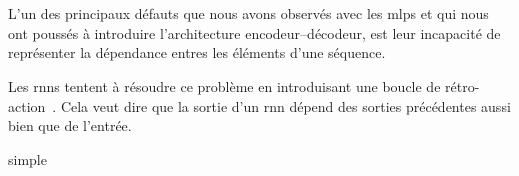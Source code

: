 \section{}
\label{sec.rnn}

L'un des principaux défauts que nous avons observés avec les \glspl{mlp} 
et qui nous ont poussés à introduire l'architecture encodeur--décodeur,
est leur incapacité de représenter la dépendance entres les éléments d'une séquence.

Les \glspl{rnn} tentent à résoudre ce problème en introduisant une boucle de rétro-action~\cite{Fathi_2021}.
Cela veut dire que la sortie d'un \gls{rnn} dépend des sorties précédentes aussi bien que de l'entrée.

{simple}